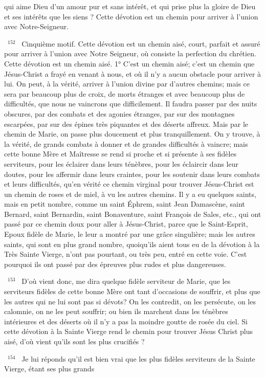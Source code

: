 \documentclass[paper=a5,pagesize=pdftex,fontsize=15pt,headinclude=on,twoside=off]{scrbook}
\newcommand{\negphantom}[1]{\settowidth{\dimen0}{#1}\hspace*{-\dimen0}}
\newcommand{\versenb}[1]{\par \vspace{10pt}~\negphantom{~${}^{#1}$~}${}^{#1}$~}
\begin{document}
qui aime Dieu d'un amour pur et sans intérêt, et qui prise plus la gloire de Dieu et ses intérêts que les siens ?
Cette dévotion est un chemin pour arriver
à l'union avec Notre-Seigneur.
\versenb{152} Cinquième motif. Cette dévotion est un chemin aisé, court, parfait et assuré pour arriver à l'union avec Notre Seigneur, où consiste la perfection du chrétien.
Cette dévotion est un chemin aisé.
1° C'est un chemin aisé; c'est un chemin que Jésus-Christ a frayé en venant à nous, et où il n'y a aucun obstacle
pour arriver à lui. On peut, à la vérité, arriver à l'union divine par d'autres chemins; mais ce sera par beaucoup plus
de croix, de morts étranges et avec beaucoup plus de difficultés, que nous ne vaincrons que difficilement. Il faudra
passer par des nuits obscures, par des combats et des agonies étranges, par sur des montagnes escarpées, par
sur des épines très piquantes et des déserts affreux. Mais par le chemin de Marie, on passe plus doucement et
plus tranquillement.
On y trouve, à la vérité, de grands combats à donner et de grandes difficultés à vaincre; mais cette bonne Mère et
Maîtresse se rend si proche et si présente à ses fidèles serviteurs, pour les éclairer dans leurs ténèbres, pour les
éclaircir dans leur doutes, pour les affermir dans leurs craintes, pour les soutenir dans leurs combats et leurs
difficultés, qu'en vérité ce chemin virginal pour trouver Jésus-Christ est un chemin de roses et de miel, à vu les
autres chemins. Il y a eu quelques saints, mais en petit nombre, comme un saint Éphrem, saint Jean Damascène,
saint Bernard, saint Bernardin, saint Bonaventure, saint François de Sales, etc., qui ont passé par ce chemin doux
pour aller à Jésus-Christ, parce que le Saint-Esprit, Epoux fidèle de Marie, le leur a montré par une grâce
singulière; mais les autres saints, qui sont en plus grand nombre, quoiqu'ils aient tous eu de la dévotion à la Très
Sainte Vierge, n'ont pas pourtant, ou très peu, entré en cette voie. C'est pourquoi ils ont passé par des épreuves
plus rudes et plus dangereuses.
\versenb{153} D'où vient donc, me dira quelque fidèle serviteur de Marie, que les serviteurs fidèles de cette bonne Mère ont
tant d'occasions de souffrir, et plus que les autres qui ne lui sont pas si dévots? On les contredit, on les persécute,
on les calomnie, on ne les peut souffrir; ou bien ils marchent dans les ténèbres intérieures et des déserts où il n'y a
pas la moindre goutte de rosée du ciel. Si cette dévotion à la Sainte Vierge rend le chemin pour trouver Jésus Christ plus aisé, d'où vient qu'ils sont les plus crucifiés ?
\versenb{154} Je lui réponds qu'il est bien vrai que les plus fidèles serviteurs de la Sainte Vierge, étant ses plus grands
\end{document}
